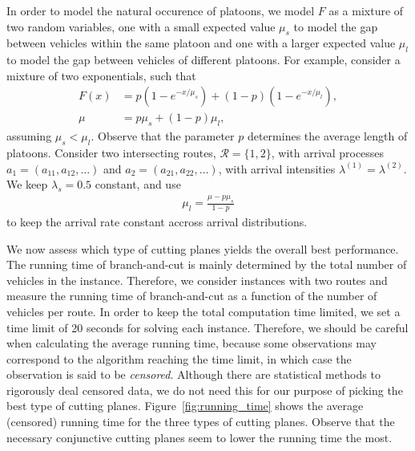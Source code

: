 \documentclass[a4paper]{article}
\theoremstyle{definition}
\theoremstyle{plain}
\begin{document}
In order to model the natural occurence of platoons, we model $F$ as a mixture
of two random variables, one with a small expected value $\mu_{s}$ to model the gap
between vehicles within the same platoon and one with a larger expected value $\mu_{l}$ to
model the gap between vehicles of different platoons. For example, consider a
mixture of two exponentials, such that
\begin{align*}
  F(x) &= p ( 1 - e^{-x / \mu_{s}} ) + (1 - p) (1 - e^{-x / \mu_{l}}) , \\[0.2em]
  \mu &= p \mu_{s} + (1-p) \mu_{l} ,
\end{align*}
%
assuming $\mu_{s} < \mu_{l}$. Observe that the parameter $p$ determines
the average length of platoons.
%
Consider two intersecting routes, $\mathcal{R} = \{1, 2\}$, with arrival processes
$a_{1} = (a_{11}, a_{12}, \dots)$ and $a_{2} = (a_{21}, a_{22}, \dots)$, with
arrival intensities $\lambda^{(1)} = \lambda^{(2)}$.
%
We keep $\lambda_{s} = 0.5$ constant, and use
\begin{align*}
  \mu_{l}  = \frac{\mu - p \mu_{s}}{1 - p}
\end{align*}
to keep the arrival rate constant accross arrival distributions.

We now assess which type of cutting planes yields the overall best performance.
The running time of branch-and-cut is mainly determined by the total number of
vehicles in the instance. Therefore, we consider instances with two routes and
measure the running time of branch-and-cut as a function of the number of
vehicles per route.
%
In order to keep the total computation time limited, we set a time limit of 20
seconds for solving each instance. Therefore, we should be careful when
calculating the average running time, because some observations may correspond
to the algorithm reaching the time limit, in which case the observation is said
to be \textit{censored}. Although there are statistical methods to rigorously
deal censored data, we do not need this for our purpose of picking the best type
of cutting planes.
%
Figure~\ref{fig:running_time} shows the average (censored) running time for the
three types of cutting planes. Observe that the necessary conjunctive cutting
planes seem to lower the running time the most.
\end{document}
